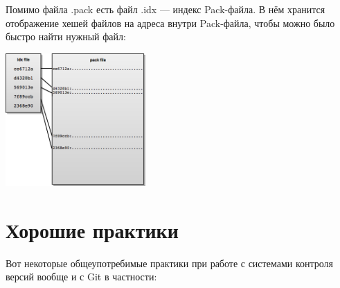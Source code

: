 \documentclass[a5paper]{article}
\begin{document}
Помимо файла .pack есть файл .idx --- индекс Pack-файла. В нём хранится отображение хешей файлов на адреса внутри Pack-файла, чтобы можно было быстро найти нужный файл:

\begin{center}
	\includegraphics[width=0.4\textwidth]{gitPackFiles.png}
\end{center}

\section{Хорошие практики}

Вот некоторые общеупотребимые практики при работе с системами контроля версий вообще и с Git в частности:
\end{document}
